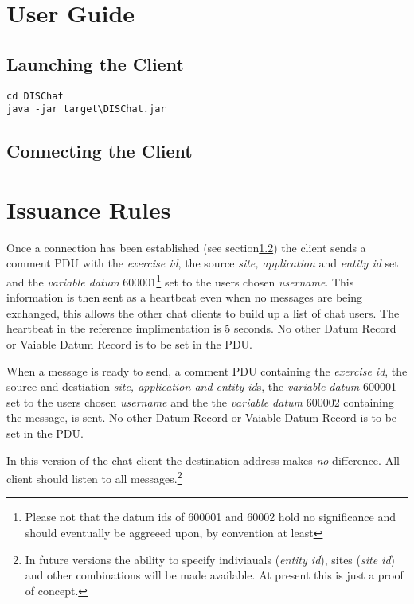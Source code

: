 \documentclass[12pt]{article}
\begin{document}
\section{User Guide}
\label{sec:user-guide}

\subsection{Launching the Client}
\label{sec:launching}

\begin{verbatim}
cd DISChat
java -jar target\DISChat.jar
\end{verbatim}

\subsection{Connecting the Client}
\label{sec:connecting}

\section{Issuance Rules}
\label{sec:issuance-rules}

Once a connection has been established (see
section\ref{sec:connecting}) the client sends a comment PDU with the
\emph{exercise id}, the source \emph{site, application} and
\emph{entity id} set and the \emph{variable datum}
600001\footnote{Please not that the datum ids of 600001 and 60002 hold
  no significance and should eventually be aggreeed upon, by
  convention at least} set to the users chosen \emph{username}. This
information is then sent as a heartbeat even when no messages are
being exchanged, this allows the other chat clients to build up a list
of chat users. The heartbeat in the reference implimentation is 5
seconds. No other Datum Record or Vaiable Datum Record is to be set in
the PDU.

When a message is ready to send, a comment PDU containing the
\emph{exercise id}, the source and destiation \emph{site, application
  and entity id}s, the \emph{variable datum} 600001 set to the users
chosen \emph{username} and the the \emph{variable datum} 600002
containing the message, is sent. No other Datum Record or Vaiable
Datum Record is to be set in the PDU.

In this version of the chat client the destination address makes
\emph{no} difference. All client should listen to all
messages.\footnote{In future versions the ability to specify
  indiviauals (\emph{entity id}), sites (\emph{site id}) and other
  combinations will be made available. At present this is just a proof
  of concept.}
\end{document}
